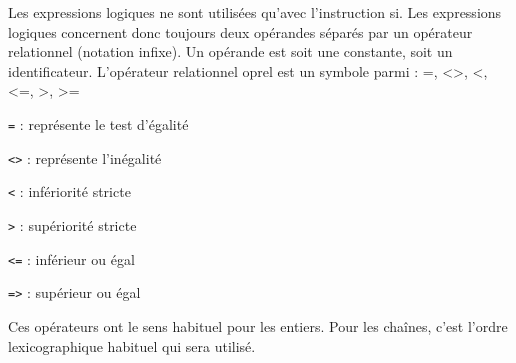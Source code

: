 Les expressions logiques ne sont utilisées qu'avec l'instruction si.
Les expressions logiques concernent donc toujours deux opérandes séparés par un opérateur relationnel (notation infixe).
Un opérande est soit une constante, soit un identificateur.
L’opérateur relationnel oprel est un symbole parmi : =, <>, <, <=, >, >= \\

\begin{description}
	\item \verb |=| : représente le test d’égalité
	\item \verb |<>| : représente l’inégalité
	\item \verb |<| : infériorité stricte
	\item \verb |>| : supériorité stricte
	\item \verb |<=| : inférieur ou égal
	\item \verb |=>| : supérieur ou égal
\end{description}

Ces opérateurs ont le sens habituel pour les entiers.
Pour les chaînes, c'est l'ordre lexicographique habituel qui sera utilisé. \\